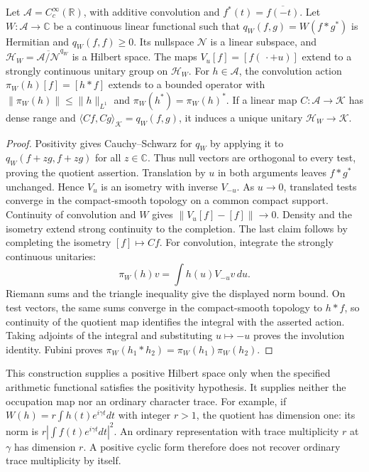 \begin{proposition}
\label{v4-arith:mc:positive-form}
Let $\mathscr A=C_c^\infty(\mathbb R)$, with additive convolution
and $f^*(t)=\overline{f(-t)}$. Let $W:\mathscr A\to\mathbb C$
be a continuous linear functional such that
$q_W(f,g)=W(f*g^*)$ is Hermitian and $q_W(f,f)\geq0$.
Its nullspace $\mathscr N$ is a linear subspace, and
$\mathcal H_W=\overline{\mathscr A/\mathscr N}^{q_W}$ is a Hilbert space.
The maps $V_u[f]=[f(\,\cdot+u)]$ extend to a strongly continuous
unitary group on $\mathcal H_W$.
For $h\in\mathscr A$, the convolution action
$\pi_W(h)[f]=[h*f]$ extends to a bounded operator with
$\|\pi_W(h)\|\leq\|h\|_{L^1}$ and
$\pi_W(h^*)=\pi_W(h)^*$.
If a linear map $C:\mathscr A\to\mathcal K$ has dense range and
$\langle Cf,Cg\rangle_{\mathcal K}=q_W(f,g)$, it induces a unique
unitary $\mathcal H_W\to\mathcal K$.
\end{proposition}
\begin{proof}
Positivity gives Cauchy--Schwarz for $q_W$ by applying it to
$q_W(f+zg,f+zg)$ for all $z\in\mathbb C$.
Thus null vectors are orthogonal to every test, proving the quotient
assertion. Translation by $u$ in both arguments leaves $f*g^*$
unchanged. Hence $V_u$ is an isometry with inverse $V_{-u}$.
As $u\to0$, translated tests converge in the compact-smooth topology
on a common compact support. Continuity of convolution and $W$
gives $\|V_u[f]-[f]\|\to0$. Density and the isometry extend strong
continuity to the completion. The last claim follows by completing
the isometry $[f]\mapsto Cf$.
For convolution, integrate the strongly continuous unitaries:
\[
 \pi_W(h)v=\int h(u)V_{-u}v\,du.
\]
Riemann sums and the triangle inequality give the displayed norm
bound. On test vectors, the same sums converge in the compact-smooth
topology to $h*f$, so continuity of the quotient map identifies
the integral with the asserted action. Taking adjoints of the
integral and substituting $u\mapsto-u$ proves the involution identity.
Fubini proves $\pi_W(h_1*h_2)=\pi_W(h_1)\pi_W(h_2)$.
\end{proof}

This construction supplies a positive Hilbert space only when the
specified arithmetic functional satisfies the positivity hypothesis.
It supplies neither the occupation map nor an ordinary character trace.
For example, if $W(h)=r\int h(t)e^{i\gamma t}dt$ with integer $r>1$,
the quotient has dimension one: its norm is
$r|\int f(t)e^{i\gamma t}dt|^2$.
An ordinary representation with trace multiplicity $r$ at $\gamma$
has dimension $r$. A positive cyclic form therefore does not recover
ordinary trace multiplicity by itself.

